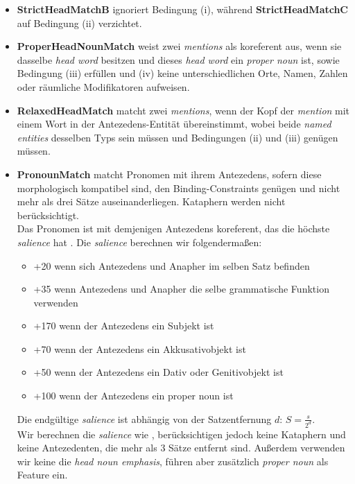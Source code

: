 \documentclass{scrartcl}
\begin{document}
\begin{itemize}
\item \textbf{StrictHeadMatchB} ignoriert Bedingung (i), während \textbf{StrictHeadMatchC}  auf Bedingung (ii) verzichtet.

\item \textbf{ProperHeadNounMatch} weist zwei \textit{mentions} als koreferent aus, wenn sie dasselbe \textit{head word} besitzen und dieses \textit{head word} ein \textit{proper noun} ist, sowie Bedingung (iii) erfüllen und (iv) keine unterschiedlichen Orte, Namen, Zahlen oder räumliche Modifikatoren aufweisen.

\item \textbf{RelaxedHeadMatch} matcht zwei \textit{mentions}, wenn der Kopf der \textit{mention} mit einem Wort in der Antezedens-Entität übereinstimmt, wobei beide \textit{named entities} desselben Typs sein müssen und Bedingungen (ii) und (iii) genügen müssen.

\item \textbf{PronounMatch} matcht Pronomen mit ihrem Antezedens, sofern diese morphologisch kompatibel sind, den Binding-Constraints genügen und nicht mehr als drei Sätze auseinanderliegen. Kataphern werden nicht berücksichtigt. \\
Das Pronomen ist mit demjenigen Antezedens koreferent, das die höchste \textit{salience} hat \cite{wunsch2006}. Die \textit{salience} berechnen wir folgendermaßen:

\begin{itemize}[]
	\item +20 wenn sich  Antezedens und Anapher im selben Satz befinden
	\item +35 wenn Antezedens und Anapher die selbe grammatische Funktion verwenden
	\item +170 wenn der Antezedens ein Subjekt ist
	\item +70 wenn der Antezedens ein Akkusativobjekt ist
	\item +50 wenn der Antezedens ein Dativ oder Genitivobjekt ist
	\item +100 wenn der Antezedens ein proper noun ist
\end{itemize}

Die endgültige \textit{salience} ist abhängig von der Satzentfernung $d$: $S = \frac{s}{2^d}$. \\
Wir berechnen die \textit{salience} wie , berücksichtigen jedoch keine Kataphern und keine Antezedenten, die mehr als 3 Sätze entfernt sind. Außerdem verwenden wir keine die \textit{head noun emphasis}, führen aber zusätzlich \textit{proper noun} als Feature ein.  
\end{itemize}
\end{document}
